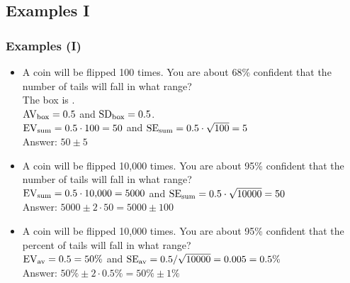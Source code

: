 \documentclass[t]{beamer}
\begin{document}
\subsection{Examples I}
\begin{frame}
\frametitle{Examples (I)}

\footnotesize

\begin{itemize}
\item A coin will be flipped 100 times.  You are about 68\%  confident that the 
     {\color{blue}number} of tails will fall in what range?\\
    The box is .\\[3pt]
    $\mbox{AV}_{\scriptsize\mbox{box}}  = 0.5$ and 
    $\mbox{SD}_{\scriptsize\mbox{box}}  = 0.5$.\\
    $\mbox{EV}_{\scriptsize\mbox{sum}}  = 0.5\cdot 100 = 50$ and 
    $\mbox{SE}_{\scriptsize\mbox{sum}}  = 0.5\cdot \sqrt{100} = 5$\\
    Answer:  $50 \pm 5$
%
\item A coin will be flipped 10,000 times.  You are about 95\%  confident that the 
     {\color{blue}number} of tails will fall in what range?\\
    $\mbox{EV}_{\scriptsize\mbox{sum}}  = 0.5\cdot 10,\!000 = 5000$ and 
    $\mbox{SE}_{\scriptsize\mbox{sum}}  = 0.5\cdot \sqrt{10000} = 50$\\
    Answer:  $5000 \pm 2\cdot 50 = 5000\pm 100$
%
\item A coin will be flipped 10,000 times.  You are about 95\%  confident that the 
     {\color{darkgreen}percent} of tails will fall in what range?\\
    $\mbox{EV}_{\scriptsize\mbox{av}}  = 0.5 = 50\%$ and 
    $\mbox{SE}_{\scriptsize\mbox{av}}  = 0.5 /\sqrt{10000} = 0.005 = 0.5\%$\\
    Answer:  $50\% \pm 2\cdot 0.5\% = 50\%\pm 1\%$
\end{itemize}

\end{frame}
\end{document}
